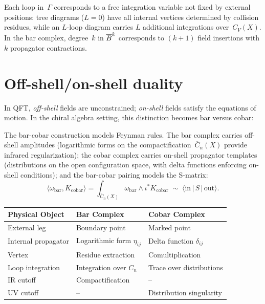 \begin{remark}
Each loop in~$\Gamma$ corresponds to a free integration variable not
fixed by external positions: tree diagrams ($L=0$) have all internal
vertices determined by collision residues, while an $L$-loop diagram
carries $L$ additional integrations over~$C_V(X)$.  In the bar complex,
degree~$k$ in $\overline{B}^k$ corresponds to $(k+1)$ field insertions with
$k$ propagator contractions.
\end{remark}

\section{Off-shell/on-shell duality}

In QFT, \emph{off-shell} fields are unconstrained; \emph{on-shell}
fields satisfy the equations of motion.  In the chiral algebra setting,
this distinction becomes bar versus cobar:

\begin{conjecture}
\label{conj:physical-pairing}
The bar-cobar construction models Feynman rules.  The bar complex
carries off-shell amplitudes (logarithmic forms on the
compactification~$\overline{C}_n(X)$ provide infrared regularization);
the cobar complex carries on-shell propagator templates (distributions
on the open configuration space, with delta functions enforcing on-shell
conditions); and the bar-cobar pairing models the S-matrix:
\[
\langle \omega_{\text{bar}}, K_{\text{cobar}} \rangle
= \int_{\overline{C}_n(X)}
\omega_{\text{bar}} \wedge \iota^* K_{\text{cobar}}
\;\sim\;
\langle \text{in} \,|\, S \,|\, \text{out} \rangle.
\]

\begin{center}
\begin{tabular}{lll}
\toprule
\textbf{Physical Object} & \textbf{Bar Complex} & \textbf{Cobar Complex} \\
\midrule
External leg & Boundary point & Marked point \\
Internal propagator & Logarithmic form $\eta_{ij}$ & Delta function $\delta_{ij}$ \\
Vertex & Residue extraction & Comultiplication \\
Loop integration & Integration over $C_n$ & Trace over distributions \\
IR cutoff & Compactification & -- \\
UV cutoff & -- & Distribution singularity \\
\bottomrule
\end{tabular}
\end{center}
\end{conjecture}

